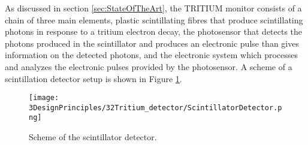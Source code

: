 As discussed in section \ref{sec:StateOfTheArt}, the TRITIUM monitor consists of a chain of three main elements, plastic scintillating fibres that produce scintillating photons in response to a tritium electron decay, the photosensor that detects the photons produced in the scintillator and produces an electronic pulse than gives information on the detected photons, and the electronic system which processes and analyzes the electronic pulses provided by the photosensor. A scheme of a scintillation detector setup is shown in Figure \ref{fig:ScintillatorDetector}.

\begin{figure}[hbtp]
\texttt{[image: 3DesignPrinciples/32Tritium\_detector/ScintillatorDetector.png]}
\centering
\caption{Scheme of the scintillator detector.\label{fig:ScintillatorDetector}}
\end{figure}
